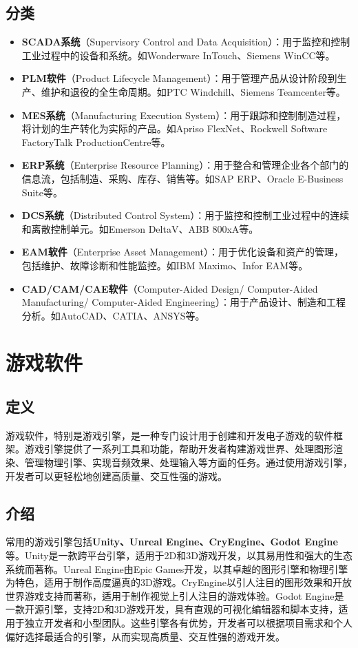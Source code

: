\documentclass[11pt, a4paper, oneside]{ctexbook}
\begin{document}
\subsection{分类}
\begin{itemize}
    \item \textbf{SCADA系统}（Supervisory Control and Data Acquisition）：用于监控和控制工业过程中的设备和系统。如Wonderware InTouch、Siemens WinCC等。
    \item \textbf{PLM软件}（Product Lifecycle Management）：用于管理产品从设计阶段到生产、维护和退役的全生命周期。如PTC Windchill、Siemens Teamcenter等。
    \item \textbf{MES系统}（Manufacturing Execution System）：用于跟踪和控制制造过程，将计划的生产转化为实际的产品。如Apriso FlexNet、Rockwell Software FactoryTalk ProductionCentre等。
    \item \textbf{ERP系统}（Enterprise Resource Planning）：用于整合和管理企业各个部门的信息流，包括制造、采购、库存、销售等。如SAP ERP、Oracle E-Business Suite等。
    \item \textbf{DCS系统}（Distributed Control System）：用于监控和控制工业过程中的连续和离散控制单元。如Emerson DeltaV、ABB 800xA等。
    \item \textbf{EAM软件}（Enterprise Asset Management）：用于优化设备和资产的管理，包括维护、故障诊断和性能监控。如IBM Maximo、Infor EAM等。
    \item \textbf{CAD/CAM/CAE软件}（Computer-Aided Design/ Computer-Aided Manufacturing/ Computer-Aided Engineering）：用于产品设计、制造和工程分析。如AutoCAD、CATIA、ANSYS等。
\end{itemize}
\section{游戏软件}
\subsection{定义}
游戏软件，特别是游戏引擎，是一种专门设计用于创建和开发电子游戏的软件框架。游戏引擎提供了一系列工具和功能，帮助开发者构建游戏世界、处理图形渲染、管理物理引擎、实现音频效果、处理输入等方面的任务。通过使用游戏引擎，开发者可以更轻松地创建高质量、交互性强的游戏。
\subsection{介绍}
常用的游戏引擎包括\textbf{Unity、Unreal Engine、CryEngine、Godot Engine}等。Unity是一款跨平台引擎，适用于2D和3D游戏开发，以其易用性和强大的生态系统而著称。Unreal Engine由Epic Games开发，以其卓越的图形引擎和物理引擎为特色，适用于制作高度逼真的3D游戏。CryEngine以引人注目的图形效果和开放世界游戏支持而著称，适用于制作视觉上引人注目的游戏体验。Godot Engine是一款开源引擎，支持2D和3D游戏开发，具有直观的可视化编辑器和脚本支持，适用于独立开发者和小型团队。这些引擎各有优势，开发者可以根据项目需求和个人偏好选择最适合的引擎，从而实现高质量、交互性强的游戏开发。
\end{document}
